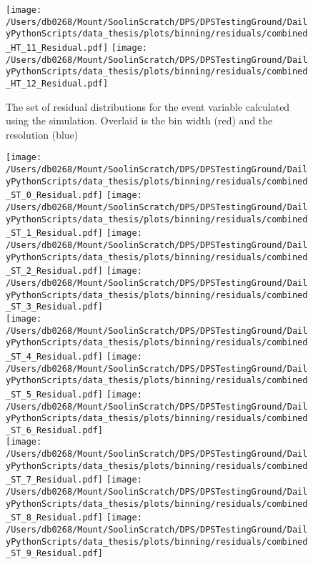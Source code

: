 \begin{figure}[htpb]
	\texttt{[image: /Users/db0268/Mount/SoolinScratch/DPS/DPSTestingGround/DailyPythonScripts/data\_thesis/plots/binning/residuals/combined\_HT\_11\_Residual.pdf]}
	\texttt{[image: /Users/db0268/Mount/SoolinScratch/DPS/DPSTestingGround/DailyPythonScripts/data\_thesis/plots/binning/residuals/combined\_HT\_12\_Residual.pdf]}
	\caption[The set of residual distributions for the \HT{} event variable calculated using the \powhegpythia{} simulation. Overlaid is the bin width (red) and the resolution (blue)]{The set of residual distributions for the \HT{} event variable calculated using the \powhegpythia{} simulation. Overlaid is the bin width (red) and the resolution (blue)}
	\label{fig:ResHT}
\end{figure}
\begin{figure}[htpb]
	\centering
	\texttt{[image: /Users/db0268/Mount/SoolinScratch/DPS/DPSTestingGround/DailyPythonScripts/data\_thesis/plots/binning/residuals/combined\_ST\_0\_Residual.pdf]}
	\texttt{[image: /Users/db0268/Mount/SoolinScratch/DPS/DPSTestingGround/DailyPythonScripts/data\_thesis/plots/binning/residuals/combined\_ST\_1\_Residual.pdf]}
	\texttt{[image: /Users/db0268/Mount/SoolinScratch/DPS/DPSTestingGround/DailyPythonScripts/data\_thesis/plots/binning/residuals/combined\_ST\_2\_Residual.pdf]} 
	\texttt{[image: /Users/db0268/Mount/SoolinScratch/DPS/DPSTestingGround/DailyPythonScripts/data\_thesis/plots/binning/residuals/combined\_ST\_3\_Residual.pdf]} \\
	\texttt{[image: /Users/db0268/Mount/SoolinScratch/DPS/DPSTestingGround/DailyPythonScripts/data\_thesis/plots/binning/residuals/combined\_ST\_4\_Residual.pdf]} 
	\texttt{[image: /Users/db0268/Mount/SoolinScratch/DPS/DPSTestingGround/DailyPythonScripts/data\_thesis/plots/binning/residuals/combined\_ST\_5\_Residual.pdf]} 
	\texttt{[image: /Users/db0268/Mount/SoolinScratch/DPS/DPSTestingGround/DailyPythonScripts/data\_thesis/plots/binning/residuals/combined\_ST\_6\_Residual.pdf]} \\
	\texttt{[image: /Users/db0268/Mount/SoolinScratch/DPS/DPSTestingGround/DailyPythonScripts/data\_thesis/plots/binning/residuals/combined\_ST\_7\_Residual.pdf]}
	\texttt{[image: /Users/db0268/Mount/SoolinScratch/DPS/DPSTestingGround/DailyPythonScripts/data\_thesis/plots/binning/residuals/combined\_ST\_8\_Residual.pdf]} 
	\texttt{[image: /Users/db0268/Mount/SoolinScratch/DPS/DPSTestingGround/DailyPythonScripts/data\_thesis/plots/binning/residuals/combined\_ST\_9\_Residual.pdf]} \\

\end{figure}
